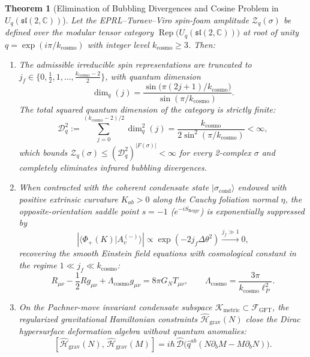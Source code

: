 \documentclass[11pt,a4paper]{article}
\theoremstyle{plain}
\newtheorem{theorem}{Theorem}[section]
\theoremstyle{definition}
\theoremstyle{remark}
\newcommand{\Rep}{\operatorname{Rep}}
\newcommand{\K}{\mathcal{K}}
\newcommand{\Hilb}{\mathcal{H}}
\newcommand{\D}{\mathcal{D}}
\newcommand{\F}{\mathcal{F}}
\newcommand{\C}{\mathbb{C}}
\begin{document}
\begin{theorem}[Elimination of Bubbling Divergences and Cosine Problem in $U_q(\mathfrak{sl}(2,\mathbb{C}))$]
\label{thm:spinfoam_finiteness}
Let the EPRL--Turaev--Viro spin-foam amplitude $\mathcal{Z}_q(\sigma)$ be defined over the modular tensor category $\Rep\big(U_q(\mathfrak{sl}(2,\C))\big)$ at root of unity $q = \exp(i\pi / k_{\mathrm{cosmo}})$ with integer level $k_{\mathrm{cosmo}} \ge 3$. Then:
\begin{enumerate}[label=(\roman*)]
  \item The admissible irreducible spin representations are truncated to $j_f \in \{0, \frac{1}{2}, 1, \dots, \frac{k_{\mathrm{cosmo}}-2}{2}\}$, with quantum dimension
  \begin{equation}
    \dim_q(j) = \frac{\sin\big(\pi(2j+1)/k_{\mathrm{cosmo}}\big)}{\sin(\pi/k_{\mathrm{cosmo}})}.
  \end{equation}
  The total squared quantum dimension of the category is strictly finite:
  \begin{equation}
    \label{eq:quantum_dim_sum}
    \mathcal{D}_q^2 := \sum_{j=0}^{(k_{\mathrm{cosmo}}-2)/2} \dim_q^2(j) = \frac{k_{\mathrm{cosmo}}}{2\sin^2(\pi / k_{\mathrm{cosmo}})} < \infty,
  \end{equation}
  which bounds $\mathcal{Z}_q(\sigma) \le (\mathcal{D}_q^2)^{|F(\sigma)|} < \infty$ for every 2-complex $\sigma$ and completely eliminates infrared bubbling divergences.
  \item When contracted with the coherent condensate state $|\sigma_{\mathrm{cond}}\rangle$ endowed with positive extrinsic curvature $K_{ab} > 0$ along the Cauchy foliation normal $\eta$, the opposite-orientation saddle point $s = -1$ ($e^{-i S_{\mathrm{Regge}}}$) is exponentially suppressed by
  \begin{equation}
    \left| \langle \Phi_+(K) | A_v^{(-)} \rangle \right| \propto \exp\left( -2 j_f \Delta\theta^2 \right) \xrightarrow{j_f \gg 1} 0,
  \end{equation}
  recovering the smooth Einstein field equations with cosmological constant in the regime $1 \ll j_f \ll k_{\mathrm{cosmo}}$:
  \begin{equation}
    R_{\mu\nu} - \frac{1}{2} R g_{\mu\nu} + \Lambda_{\mathrm{cosmo}} g_{\mu\nu} = 8\pi G_N T_{\mu\nu}, \qquad \Lambda_{\mathrm{cosmo}} = \frac{3\pi}{k_{\mathrm{cosmo}} \ell_P^2}.
  \end{equation}
  \item On the Pachner-move invariant condensate subspace $\K_{\mathrm{metric}} \subset \F_{\mathrm{GFT}}$, the regularized gravitational Hamiltonian constraints $\hat{\Hilb}_{\mathrm{grav}}(N)$ close the Dirac hypersurface deformation algebra without quantum anomalies:
  \begin{equation}
    \left[ \hat{\Hilb}_{\mathrm{grav}}(N), \, \hat{\Hilb}_{\mathrm{grav}}(M) \right] = i\hbar \, \hat{\D}\big( \hat{q}^{ab}(N\partial_b M - M\partial_b N) \big).
  \end{equation}
\end{enumerate}
\end{theorem}
\end{document}
